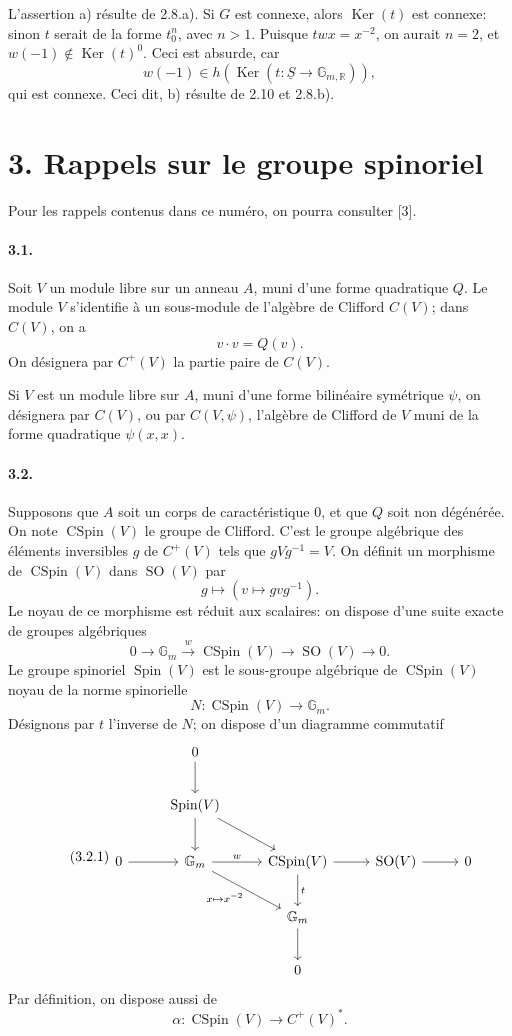 \documentclass[10pt]{article}
\newcommand{\R}{\mathbb{R}}
\newcommand{\Gm}{\mathbb{G}_m}
\newcommand{\SO}{\operatorname{SO}}
\newcommand{\Spin}{\operatorname{Spin}}
\newcommand{\CSpin}{\operatorname{CSpin}}
\newcommand{\Ker}{\operatorname{Ker}}
\begin{document}
L'assertion a) résulte de 2.8.a). Si $G$ est connexe, alors $\Ker(t)$ est connexe: sinon $t$ serait de la forme $t_0^n$, avec $n>1$. Puisque $twx=x^{-2}$, on aurait $n=2$, et $w(-1)\notin\Ker(t)^0$. Ceci est absurde, car
\[
w(-1)\in h(\Ker(t:\underline S\to\mathbb G_{m,\R})),
\]
qui est connexe. Ceci dit, b) résulte de 2.10 et 2.8.b).

\section*{3. Rappels sur le groupe spinoriel}

Pour les rappels contenus dans ce numéro, on pourra consulter [3].

\paragraph{3.1.} Soit $V$ un module libre sur un anneau $A$, muni d'une forme quadratique $Q$. Le module $V$ s'identifie à un sous-module de l'algèbre de Clifford $C(V)$; dans $C(V)$, on a
\[
v\cdot v=Q(v).
\]
On désignera par $C^+(V)$ la partie paire de $C(V)$.

Si $V$ est un module libre sur $A$, muni d'une forme bilinéaire symétrique $\psi$, on désignera par $C(V)$, ou par $C(V,\psi)$, l'algèbre de Clifford de $V$ muni de la forme quadratique $\psi(x,x)$.

\paragraph{3.2.} Supposons que $A$ soit un corps de caractéristique $0$, et que $Q$ soit non dégénérée. On note $\CSpin(V)$ le groupe de Clifford. C'est le groupe algébrique des éléments inversibles $g$ de $C^+(V)$ tels que $gVg^{-1}=V$. On définit un morphisme de $\CSpin(V)$ dans $\SO(V)$ par
\[
g\longmapsto (v\mapsto gvg^{-1}).
\]
Le noyau de ce morphisme est réduit aux scalaires: on dispose d'une suite exacte de groupes algébriques
\[
0\longrightarrow\Gm\xrightarrow{\ w\ }\CSpin(V)\longrightarrow\SO(V)\longrightarrow0.
\]
Le groupe spinoriel $\Spin(V)$ est le sous-groupe algébrique de $\CSpin(V)$ noyau de la norme spinorielle
\[
N:\CSpin(V)\longrightarrow\Gm.
\]
Désignons par $t$ l'inverse de $N$; on dispose d'un diagramme commutatif
\[
\tag{3.2.1}
\begin{tikzcd}[column sep=2.6em,row sep=2.3em]
& 0 \arrow[d] & \\
& \Spin(V) \arrow[d] \arrow[dr] & \\
0 \arrow[r] & \Gm \arrow[r,"w"] \arrow[dr,"x\mapsto x^{-2}"'] & \CSpin(V) \arrow[r] \arrow[d,"t"] & \SO(V) \arrow[r] & 0\\
& & \Gm \arrow[d] & \\
& & 0 &
\end{tikzcd}
\]
Par définition, on dispose aussi de
\[
\tag{3.2.2}
\alpha:\CSpin(V)\longrightarrow C^+(V)^*.
\]
\end{document}
